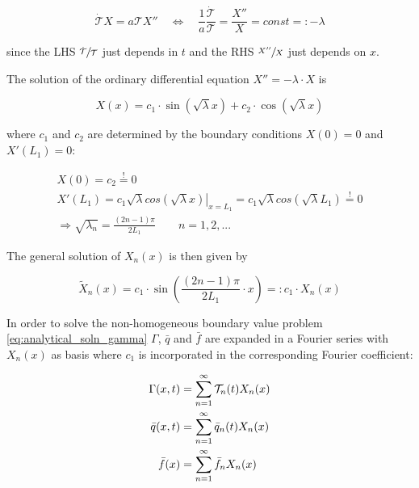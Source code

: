 \documentclass{scrartcl}[12pt, halfparskip]
\numberwithin{equation}{section}
\numberwithin{figure}{section}
\numberwithin{table}{section}
\begin{document}
\begin{equation}
	\dot{\mathcal{T}} X = a \mathcal{T} X'' \quad \Leftrightarrow \quad \frac{1}{a} \frac{\dot{\mathcal{T}}}{\mathcal{T}} = \frac{X''}{X} = const =: - \lambda
\end{equation}


since the LHS $\sfrac{\dot{\mathcal{T}}}{{\mathcal{T}}}$ just depends in $t$ and the RHS $\sfrac{X''}{X}$ just depends on $x$. 

The solution of the ordinary differential equation $X'' = - \lambda \cdot X$ is

\begin{equation}
	X(x) = c_1 \cdot \sin(\sqrt{\lambda} x) + c_2 \cdot \cos(\sqrt{\lambda} x)
\end{equation}

where $c_1$ and $c_2$ are determined by the boundary conditions $X(0) = 0$ and $X'(L_1) = 0$:

\begin{align}
	X(0) = c_2 \stackrel{!}{=} 0 \\
	X'(L_1) = \left. c_1 \sqrt{\lambda} cos(\sqrt{\lambda} x) \right|_{x=L_1} = c_1 \sqrt{\lambda} cos(\sqrt{\lambda} L_1) \stackrel{!}{=} 0 \\
	\Rightarrow \sqrt{\lambda_n} = \frac{(2n -1)\pi}{2 L_1} \qquad n=1,2,...
\end{align}

The general solution of $X_n(x)$ is then given by

\begin{equation}
	\tilde{X}_n(x) = c_1 \cdot \sin\left(\frac{(2n -1)\pi}{2 L_1} \cdot x\right) =: c_1 \cdot X_n(x)
\end{equation}

In order to solve the non-homogeneous boundary value problem \eqref{eq:analytical_soln_gamma} $\Gamma$, $\bar{q}$ and $\bar{f}$ are expanded in a Fourier series with $X_n(x)$ as basis where $c_1$ is incorporated in the corresponding Fourier coefficient:

\begin{subequations}
	\centering
	\begin{align}
		\Gamma(x,t) & = \sum_{n=1}^{\infty} \mathcal{T}_n(t) X_n(x) \\
		\bar{q}(x,t) & = \sum_{n=1}^{\infty} \bar{q}_n(t) X_n(x) \\
		\bar{f}(x) & = \sum_{n=1}^{\infty} \bar{f}_n X_n(x)
	\end{align}
\end{subequations}
\end{document}
